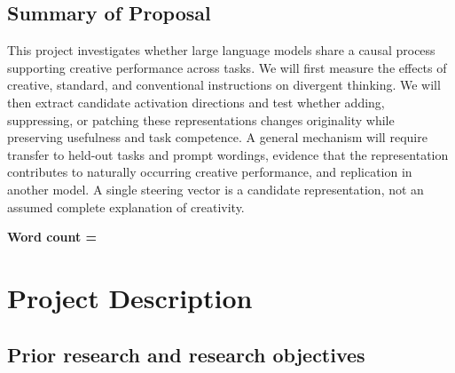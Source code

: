 \documentclass{article}
\begin{document}
\subsection{Summary of Proposal}
\countem
This project investigates whether large language models share a causal process supporting creative performance across tasks. We will first measure the effects of creative, standard, and conventional instructions on divergent thinking. We will then extract candidate activation directions and test whether adding, suppressing, or patching these representations changes originality while preserving usefulness and task competence. A general mechanism will require transfer to held-out tasks and prompt wordings, evidence that the representation contributes to naturally occurring creative performance, and replication in another model. A single steering vector is a candidate representation, not an assumed complete explanation of creativity.


\endcountem
\textbf{Word count = \thewordcount{}}

\section{Project Description}
\countem
\subsection{Prior research and research objectives}
\end{document}
